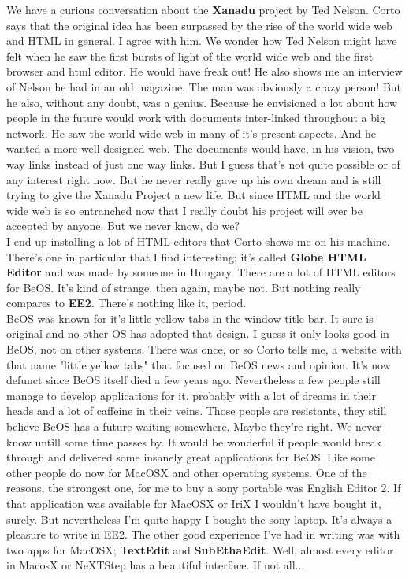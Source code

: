 \documentclass[11pt,twoside,a4paper]{book}
\begin{document}
\begin{multicols*}{2}
    We have a curious conversation about the \textbf{Xanadu} project by Ted Nelson. Corto says that the original idea has been surpassed by the rise of the world wide web and HTML in general. I agree with him. We wonder how Ted Nelson might have felt when he saw the first bursts of light of the world wide web and the first browser and html editor. He would have freak out! He also shows me an interview of Nelson he had in an old magazine. The man was obviously a crazy person! But he also, without any doubt, was a genius. Because he envisioned a lot about how people in the future would work with documents inter-linked throughout a big network. He saw the world wide web in many of it's present aspects. And he wanted a more well designed web. The documents would have, in his vision, two way links instead of just one way links. But I guess that's not quite possible or of any interest right now. But he never really gave up his own dream and is still trying to give the Xanadu Project a new life. But since HTML and the world wide web is so entranched now that I really doubt his project will ever be accepted by anyone. But we never know, do we? ~\\

    I end up installing a lot of HTML editors that Corto shows me on his machine. There's one in particular that I find interesting; it's called \textbf{Globe HTML Editor} and was made by someone in Hungary. There are a lot of HTML editors for BeOS. It's kind of strange, then again, maybe not. But nothing really compares to \textbf{EE2}. There's nothing like it, period. ~\\

    BeOS was known for it's little yellow tabs in the window title bar. It sure is original and no other OS has adopted that design. I guess it only looks good in BeOS, not on other systems. There was once, or so Corto tells me, a website with that name "little yellow tabs" that focused on BeOS news and opinion. It's now defunct since BeOS itself died a few years ago. Nevertheless a few people still manage to develop applications for it. probably with a lot of dreams in their heads and a lot of caffeine in their veins. Those people are resistants, they still believe BeOS has a future waiting somewhere. Maybe they're right. We never know untill some time passes by. It would be wonderful if people would break through and delivered some insanely great applications for BeOS. Like some other people do now for MacOSX and other operating systems. One of the reasons, the strongest one, for me to buy a sony portable was English Editor 2. If that application was available for MacOSX or IriX I wouldn't have bought it, surely. But nevertheless I'm quite happy I bought the sony laptop. It's always a pleasure to write in EE2. The other good experience I've had in writing was with two apps for MacOSX; \textbf{TextEdit} and \textbf{SubEthaEdit}. Well, almost every editor in MacosX or NeXTStep has a beautiful interface. If not all... ~\\


\end{multicols*}
\end{document}
